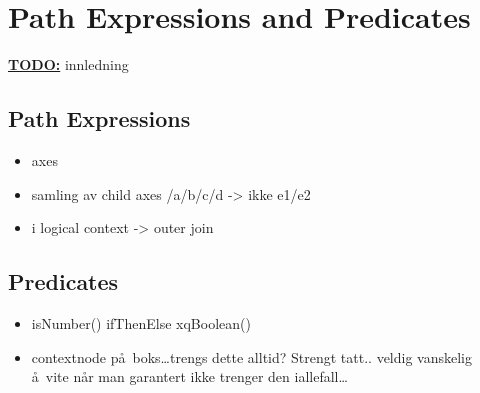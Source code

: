 \section{Path Expressions and Predicates}
\underline{\textbf{\LARGE TODO:}} innledning

\subsection{Path Expressions}
\label{sect:trans:TD:pathExprs}
\begin{itemize}
  \item axes
  \item samling av child axes /a/b/c/d -> ikke e1/e2
  \item i logical context -> outer join
\end{itemize}

\subsection{Predicates}
\label{sect:trans:TD:predicates}
\begin{itemize}
  \item isNumber() ifThenElse xqBoolean()
  \item contextnode p\aa~boks\ldots trengs dette alltid? Strengt tatt.. veldig vanskelig \aa~vite n\aa r man
  garantert ikke trenger den iallefall\ldots
\end{itemize}
